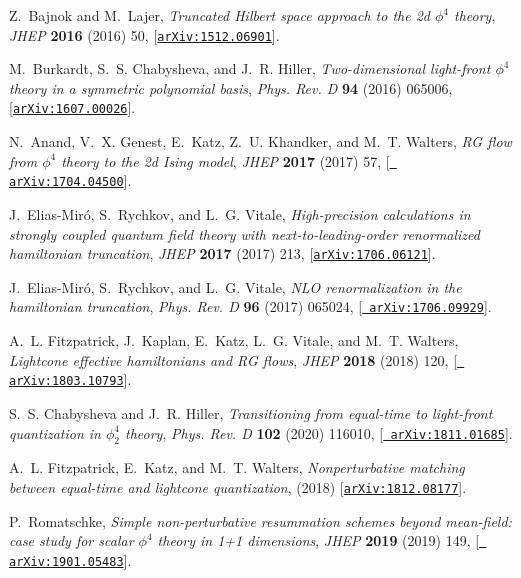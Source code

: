 \documentclass[a4paper,11pt]{article}
\begin{document}
\begin{thebibliography}{10}
Z.~Bajnok and M.~Lajer, {\it Truncated \textrm{H}ilbert space approach to the
  2d $\phi^4$ theory},  {\em JHEP} {\bf 2016} (2016) 50,
  [\href{http://arxiv.org/abs/1512.06901}{{\tt arXiv:1512.06901}}].

M.~Burkardt, S.~S. Chabysheva, and J.~R. Hiller, {\it Two-dimensional
  light-front ${\ensuremath{\phi}}^{4}$ theory in a symmetric polynomial
  basis},  {\em Phys. Rev. D} {\bf 94} (2016) 065006,
  [\href{http://arxiv.org/abs/1607.00026}{{\tt arXiv:1607.00026}}].

N.~Anand, V.~X. Genest, E.~Katz, Z.~U. Khandker, and M.~T. Walters, {\it
  \textrm{RG} flow from $\phi^4$ theory to the 2d \textrm{I}sing model},  {\em
  JHEP} {\bf 2017} (2017) 57, [\href{http://arxiv.org/abs/1704.04500}{{\tt
  arXiv:1704.04500}}].

J.~Elias-Mir\'o, S.~Rychkov, and L.~G. Vitale, {\it High-precision calculations
  in strongly coupled quantum field theory with next-to-leading-order
  renormalized hamiltonian truncation},  {\em JHEP} {\bf 2017} (2017) 213,
  [\href{http://arxiv.org/abs/1706.06121}{{\tt arXiv:1706.06121}}].

J.~Elias-Mir\'o, S.~Rychkov, and L.~G. Vitale, {\it \textrm{NLO}
  renormalization in the hamiltonian truncation},  {\em Phys. Rev. D} {\bf 96}
  (2017) 065024, [\href{http://arxiv.org/abs/1706.09929}{{\tt
  arXiv:1706.09929}}].

A.~L. Fitzpatrick, J.~Kaplan, E.~Katz, L.~G. Vitale, and M.~T. Walters, {\it
  Lightcone effective hamiltonians and \textrm{RG} flows},  {\em JHEP} {\bf
  2018} (2018) 120, [\href{http://arxiv.org/abs/1803.10793}{{\tt
  arXiv:1803.10793}}].

S.~S. Chabysheva and J.~R. Hiller, {\it Transitioning from equal-time to
  light-front quantization in $\phi^4_2$ theory},  {\em Phys. Rev. D} {\bf 102}
  (2020) 116010, [\href{http://arxiv.org/abs/1811.01685}{{\tt
  arXiv:1811.01685}}].

A.~L. Fitzpatrick, E.~Katz, and M.~T. Walters, {\it Nonperturbative matching
  between equal-time and lightcone quantization},  {\em \mbox{}} (2018)
  [\href{http://arxiv.org/abs/1812.08177}{{\tt arXiv:1812.08177}}].

P.~Romatschke, {\it Simple non-perturbative resummation schemes beyond
  mean-field: case study for scalar $\phi^4$ theory in 1+1 dimensions},  {\em
  JHEP} {\bf 2019} (2019) 149, [\href{http://arxiv.org/abs/1901.05483}{{\tt
  arXiv:1901.05483}}].


\end{thebibliography}
\end{document}
